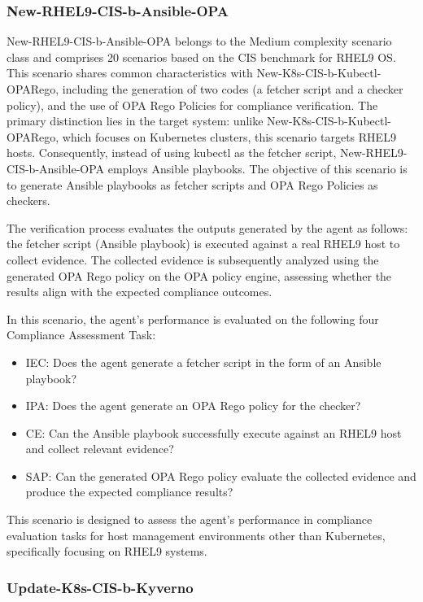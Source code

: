 \subsubsection{New-RHEL9-CIS-b-Ansible-OPA}

New-RHEL9-CIS-b-Ansible-OPA belongs to the Medium complexity scenario class and comprises 20 scenarios based on the CIS benchmark for RHEL9 OS. This scenario shares common characteristics with New-K8s-CIS-b-Kubectl-OPARego, including the generation of two codes (a fetcher script and a checker policy), and the use of OPA Rego Policies for compliance verification. The primary distinction lies in the target system: unlike New-K8s-CIS-b-Kubectl-OPARego, which focuses on Kubernetes clusters, this scenario targets RHEL9 hosts. Consequently, instead of using kubectl as the fetcher script, New-RHEL9-CIS-b-Ansible-OPA employs Ansible playbooks. The objective of this scenario is to generate Ansible playbooks as fetcher scripts and OPA Rego Policies as checkers.

The verification process evaluates the outputs generated by the agent as follows: the fetcher script (Ansible playbook) is executed against a real RHEL9 host to collect evidence. The collected evidence is subsequently analyzed using the generated OPA Rego policy on the OPA policy engine, assessing whether the results align with the expected compliance outcomes.

In this scenario, the agent's performance is evaluated on the following four Compliance Assessment Task:

\begin{itemize}
\item IEC: Does the agent generate a fetcher script in the form of an Ansible playbook?
\item IPA: Does the agent generate an OPA Rego policy for the checker?
\item CE: Can the Ansible playbook successfully execute against an RHEL9 host and collect relevant evidence?
\item SAP: Can the generated OPA Rego policy evaluate the collected evidence and produce the expected compliance results?
\end{itemize}

This scenario is designed to assess the agent's performance in compliance evaluation tasks for host management environments other than Kubernetes, specifically focusing on RHEL9 systems.

\subsubsection{Update-K8s-CIS-b-Kyverno}

